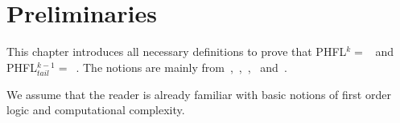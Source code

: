 \section{Preliminaries}
\label{sec:preliminaries}
This chapter introduces all necessary definitions to prove that PHFL$^k =$~ and
PHFL$^{k-1}_{tail} =$~. The notions are mainly from~\cite{immerman1999descriptive},~\cite{papadimitriou1994complexity},~\cite{otto1999bisimulation},~\cite{freireMartins2011descriptive}
and~\cite{lange2014capturing}.

We assume that the reader is already familiar with basic notions of first order logic and computational complexity.










